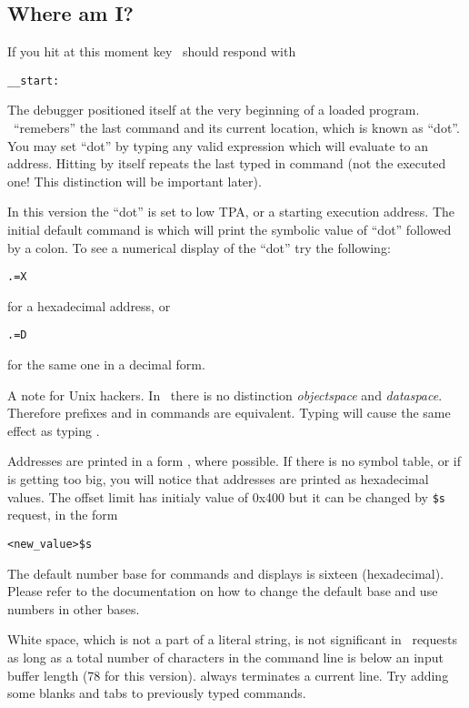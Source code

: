 \subsection{Where am I?}
If you hit at this moment  key \szadb\ should respond
with
\begin{exmpl}
	\verb|__start:|
\end{exmpl}
The debugger positioned itself at the very beginning of a loaded program.
\szadb\ ``remebers'' the last command and its current location, which
is known as ``dot''.  You may set ``dot'' by typing any valid expression
which will evaluate to an address. Hitting  by itself repeats
the last typed in command (not the executed one! This distinction will
be important later).

In this version the ``dot'' is set to low TPA, or a starting execution address.
The initial default command is 
which will print the symbolic value of ``dot'' followed by a colon.
To see a numerical display of the ``dot'' try the following:
\begin{exmpl}
	{\tt .=X }
\end{exmpl}
for a hexadecimal address, or
\begin{exmpl}
	{\tt .=D }
\end{exmpl}
for the same one in a decimal form.

A note for {\sc Unix} hackers. In \szadb\ there is no distinction
{\it objectspace} and {\it dataspace}.
Therefore prefixes  and \name{/} in commands are equivalent.
Typing  will cause the same effect as typing .

Addresses are printed in a form , where possible.
If there is no symbol table, or if  is getting too big,
you will notice that addresses are printed as hexadecimal values.
The offset limit has initialy value of 0x400 but it can be changed by
\verb|$s| request, in the form 
\begin{exmpl}
	\verb|<new_value>$s|
\end{exmpl}
The default number base for commands and displays is sixteen (hexadecimal).
Please refer to the documentation on how to change the default base and use
numbers in other bases.

White space, which is not a part of a literal string, is not significant
in \szadb\ requests as long as a total number of characters in the command
line is below an input buffer length (78 for this version).  
always terminates a current line.
Try adding some blanks and tabs to previously typed commands.

